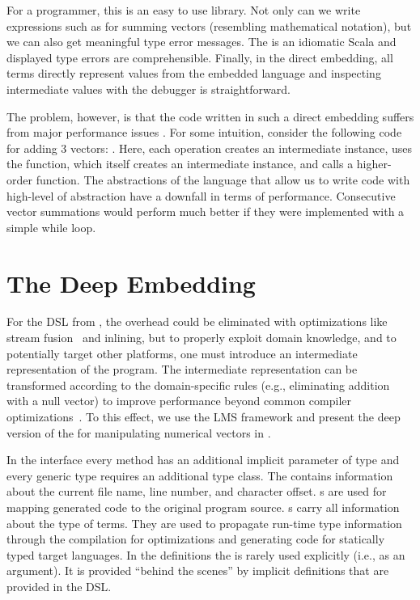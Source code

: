 For a programmer, this is an easy to use library. Not only can we write
expressions such as  for summing vectors (resembling mathematical
notation), but we can also get meaningful type error messages. The \edsl is an
idiomatic Scala and displayed type errors are comprehensible. Finally, in the
direct embedding, all terms directly represent values from the embedded language
and inspecting intermediate values with the debugger is straightforward.

The problem, however, is that the code written in such a direct embedding suffers from major performance issues \cite{rompf_optimizing_2013}. For some intuition, consider the following code for adding 3 vectors: . Here, each \code{+} operation creates an intermediate  instance, uses the  function, which itself creates an intermediate  instance, and calls a higher-order  function. The abstractions of the language that allow us to write code with high-level of abstraction have a downfall in terms of performance. Consecutive vector summations would perform much better if they were implemented with a simple while loop.

\section{The Deep Embedding}
For the DSL from , the overhead could be eliminated with
optimizations like stream fusion~\cite{coutts_stream_2007} and inlining, but to
properly exploit domain knowledge, and to potentially target other platforms,
one must introduce an intermediate representation of the \edsl program. The
intermediate representation can be transformed according to the domain-specific rules
 (e.g., eliminating addition with a null vector) to improve performance beyond common compiler
optimizations~\cite{rompf_optimizing_2013}. To this effect, we use the LMS
framework and present the deep version of the \edsl{} for manipulating numerical vectors in
.

In the  interface every method has an additional implicit
parameter of type  and every generic type requires an
additional  type class. The  contains information
about the current file name, line number, and character offset.
s are used for mapping generated code to the original
program source. s carry all information about the type of terms.
They are used to propagate run-time type information through the \edsl{}
compilation for optimizations and generating code for statically typed target
languages. In the \edsl definitions the  is rarely used
explicitly (i.e., as an argument). It is provided ``behind the scenes'' by implicit
definitions that are provided in the DSL.

